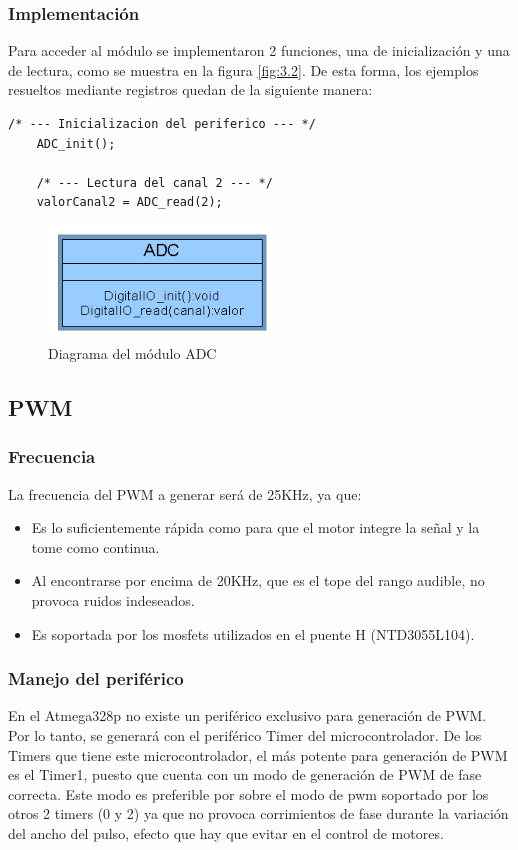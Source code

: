 \subsubsection{Implementación}

Para acceder al módulo se implementaron 2 funciones, una de inicialización y una de lectura, como se muestra en la figura \ref{fig:3.2}. De esta forma, los ejemplos resueltos mediante registros quedan de la siguiente manera:

\begin{lstlisting}[style=CStyle]
	/* --- Inicializacion del periferico --- */
	ADC_init(); 
	
	/* --- Lectura del canal 2 --- */
	valorCanal2 = ADC_read(2);
\end{lstlisting}

\begin{figure}[!ht]
	\centering
	\includegraphics[width=6cm,scale=1]{resources/3_2-moduloADC.png}
	\caption{Diagrama del módulo ADC}
	\label{fig:\thefigure}
\end{figure}

\subsection{PWM}
\subsubsection{Frecuencia}
La frecuencia del PWM a generar será de 25KHz, ya que:
\begin{itemize}
	\item Es lo suficientemente rápida como para que el motor integre la señal y la tome como continua.
	\item Al encontrarse por encima de 20KHz, que es el tope del rango audible, no provoca ruidos indeseados.
	\item Es soportada por los mosfets utilizados en el puente H (NTD3055L104).
\end{itemize}

\subsubsection{Manejo del periférico}
En el Atmega328p no existe un periférico exclusivo para generación de PWM. Por lo tanto, se generará con el periférico Timer del microcontrolador. De los Timers que tiene este microcontrolador, el más potente para generación de PWM es el Timer1, puesto que cuenta con un modo de generación de PWM de fase correcta. Este modo es preferible por sobre el modo de pwm soportado por los otros 2 timers (0 y 2) ya que no provoca corrimientos de fase durante la variación del ancho del pulso, efecto que hay que evitar en el control de motores.

